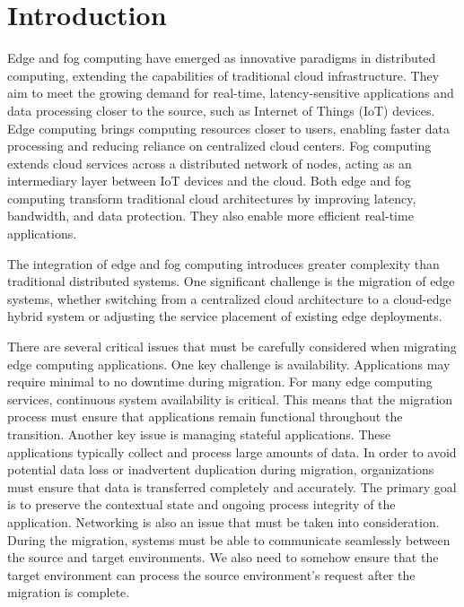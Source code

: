%
\section{Introduction}
\label{sec:introduction}
%
Edge and fog computing have emerged as innovative paradigms in distributed computing, extending the capabilities of traditional cloud infrastructure. They aim to meet the growing demand for real-time, latency-sensitive applications and data processing closer to the source, such as Internet of Things (IoT) devices.\cite{cao_overview_2020}
Edge computing brings computing resources closer to users, enabling faster data processing and reducing reliance on centralized cloud centers.\cite{satyanarayanan_emergence_2017} Fog computing extends cloud services across a distributed network of nodes, acting as an intermediary layer between IoT devices and the cloud. Both edge and fog computing transform traditional cloud architectures by improving latency, bandwidth, and data protection. They also enable more efficient real-time applications.\cite{salaht_overview_2021}

The integration of edge and fog computing introduces greater complexity than traditional distributed systems. One significant challenge is the migration of edge systems, whether switching from a centralized cloud architecture to a cloud-edge hybrid system or adjusting the service placement of existing edge deployments.

There are several critical issues that must be carefully considered when migrating edge computing applications.
One key challenge is availability. Applications may require minimal to no downtime during migration. For many edge computing services, continuous system availability is critical. This means that the migration process must ensure that applications remain functional throughout the transition.
Another key issue is managing stateful applications. These applications typically collect and process large amounts of data. In order to avoid potential data loss or inadvertent duplication during migration, organizations must ensure that data is transferred completely and accurately. The primary goal is to preserve the contextual state and ongoing process integrity of the application. 
Networking is also an issue that must be taken into consideration. During the migration, systems must be able to communicate seamlessly between the source and target environments. We also need to somehow ensure that the target environment can process the source environment's request after the migration is complete.


